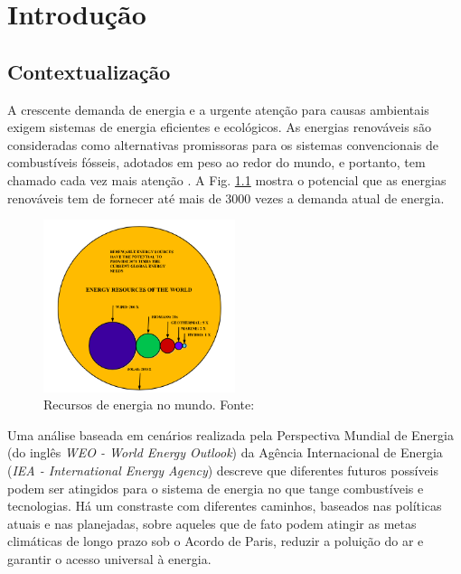 \chapter [Introdução]{Introdução}

\section{Contextualização}


A crescente demanda de energia e a urgente atenção para causas ambientais exigem sistemas de energia eficientes e ecológicos. 
As energias renováveis são consideradas como alternativas promissoras para os sistemas convencionais de combustíveis fósseis, adotados em peso ao redor do mundo, e portanto, tem chamado cada vez mais atenção \cite{Guo2018}.
A Fig. \ref{fig:energy-resources} mostra o potencial que as energias renováveis tem de fornecer até mais de 3000 vezes a demanda atual de energia.

\begin{figure}[!hbt]
	\begin{center}
    \includegraphics[width=0.5\textwidth]{figuras/Energy_Resources_of_The_World.png}
    \caption{Recursos de energia no mundo. Fonte: \cite{Ellabban2014}}
    \label{fig:energy-resources}
    \end{center}
\end{figure}

Uma análise baseada em cenários realizada pela Perspectiva Mundial de Energia (do inglês \textit{WEO - World Energy Outlook}) da Agência Internacional de Energia (\textit{IEA - International Energy Agency}) descreve que diferentes futuros possíveis podem ser atingidos para o sistema de energia no que tange combustíveis e tecnologias.
Há um constraste com diferentes caminhos, baseados nas políticas atuais e nas planejadas, sobre aqueles que de fato podem atingir as metas climáticas de longo prazo sob o Acordo de Paris, reduzir a poluição do ar e garantir o acesso universal à energia. 

